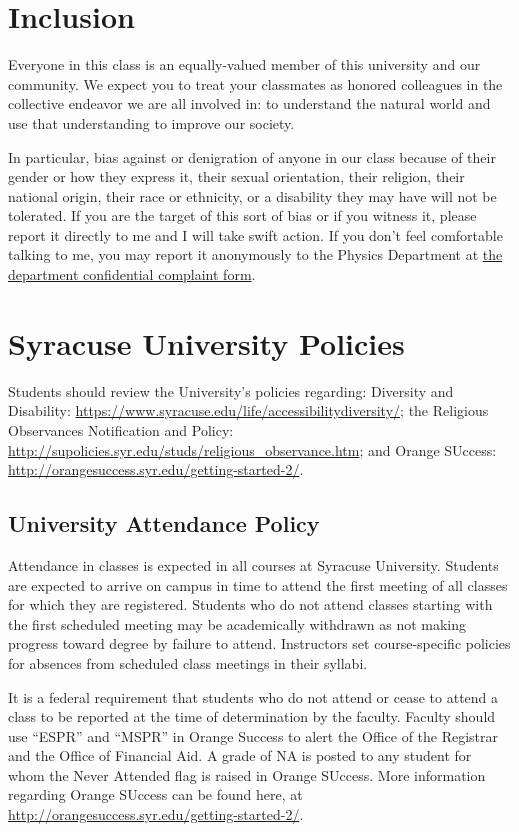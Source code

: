 \documentclass[12pt]{article}
\begin{document}
\section*{Inclusion}

Everyone in this class is an equally-valued member of this university and our community. We expect you to treat your classmates as honored colleagues in the collective endeavor we are all involved in: to understand the natural world and use that understanding to improve our society.

In particular, bias against or denigration of anyone in our class because of their gender or how they express it, their sexual orientation, their religion, their national origin, their race or ethnicity, or a disability they may have will not be tolerated. If you are the target of this sort of bias or if you witness it, please report it directly to me and I will take swift action. If you don’t feel comfortable talking to me, you may report it anonymously to the Physics Department at
\href{https://syracuseuniversity.qualtrics.com/jfe/form/SV_9pORpTKnq6pLeyF}{the department confidential complaint form}.

\newpage

\section*{Syracuse University Policies}
Students should review the University’s policies regarding: Diversity and Disability: \url{https://www.syracuse.edu/life/accessibilitydiversity/};  the Religious Observances Notification and Policy: \url{http://supolicies.syr.edu/studs/religious_observance.htm}; and Orange SUccess: \url{http://orangesuccess.syr.edu/getting-started-2/}.

\subsection*{University Attendance Policy}
Attendance in classes is expected in all courses at Syracuse University. Students are expected to arrive on campus in time to attend the first meeting of all classes for which they are registered. Students who do not attend classes starting with the first scheduled meeting may be academically withdrawn as not making progress toward degree by failure to attend. Instructors set course-specific policies for absences from scheduled class meetings in their syllabi.

It is a federal requirement that students who do not attend or cease to attend a class to be reported at the time of determination by the faculty. Faculty should use “ESPR” and “MSPR” in Orange Success to alert the Office of the Registrar and the Office of Financial Aid. A grade of NA is posted to any student for whom the Never Attended flag is raised in Orange SUccess. More information regarding Orange SUccess can be found here, at \url{http://orangesuccess.syr.edu/getting-started-2/}.
\end{document}
